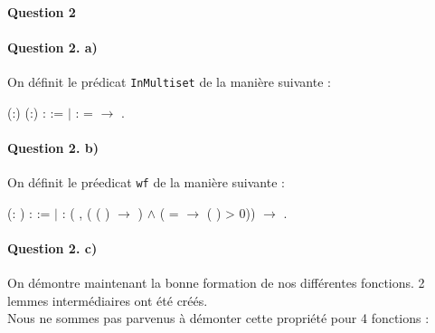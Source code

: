 \documentclass{report}
\begin{document}
\paragraph{Question 2}

\paragraph{Question 2. a)}

On définit le prédicat \texttt{InMultiset} de la manière suivante :

\noindent\begin{coqdoccode}
\coqdocemptyline
\coqdocnoindent
{}  (:) (:) :  := \coqdoceol
\coqdocindent{1.00em}
\ensuremath{|}  :    =  \ensuremath{\rightarrow}   .\coqdoceol
\coqdocemptyline
\coqdocemptyline
\end{coqdoccode}

\paragraph{Question 2. b)}

On définit le préedicat \texttt{wf} de la manière suivante :

\noindent\begin{coqdoccode}
\coqdocemptyline
\coqdocnoindent
{}  (: ) :  :=\coqdoceol
\coqdocindent{1.00em}
\ensuremath{|}  : (\coqdockw{\ensuremath{\forall}} , (  (  ) \ensuremath{\rightarrow} ) \ensuremath{\land} (   =  \ensuremath{\rightarrow} (  ) > 0)) \ensuremath{\rightarrow}  .\coqdoceol
\coqdocemptyline
\end{coqdoccode}

\paragraph{Question 2. c)}

On démontre maintenant la bonne formation de nos différentes fonctions. 2 lemmes intermédiaires ont été créés.\\
Nous ne sommes pas parvenus à démonter cette propriété pour 4 fonctions :
\end{document}
